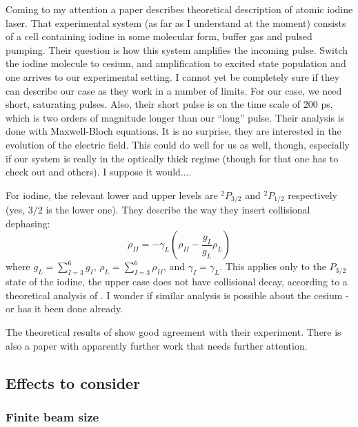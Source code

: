 \documentclass{article}
\begin{document}
\begin{spacing}{1.1}
Coming to my attention a paper \cite{Riley1979} describes theoretical description of atomic iodine laser. That experimental system (as far as I understand at the moment) consists of a cell containing iodine in some molecular form, buffer gas and pulsed pumping. Their question is how this system amplifies the incoming pulse. Switch the iodine molecule to cesium, and amplification to excited state population and one arrives to our experimental setting. I cannot yet be completely sure if they can describe our case as they work in a number of limits. For our case, we need short, saturating pulses. Also, their short pulse is on the time scale of 200 ps, which is two orders of magnitude longer than our ``long'' pulse. Their analysis is done with Maxwell-Bloch equations. It is no surprise, they are interested in the evolution of the electric field. This could do well for us as well, though, especially if our system is really in the optically thick regime (though for that one has to check out \cite{Godone2002} and others). I suppose it would....

For iodine, the relevant lower and upper levels are $^2P_{3/2}$ and $^2P_{1/2}$ respectively (yes, $3/2$ is the lower one). They describe the way they insert collisional dephasing:
\begin{equation}
\dot \rho_{II} = - \gamma_{L} \left(\rho_{II} - \frac{g_{I}}{g_{L}} \rho_{L}\right) 
\end{equation}
where $g_{L} = \sum_{I=3}^{6}g_{I}$, $\rho_{L}=\sum_{I=3}^{6} \rho_{II}$, and $\gamma_{I} = \gamma_{L}$. This applies only to the $P_{3/2}$ state of the iodine, the upper case does not have collisional decay, according to a theoretical analysis of \cite{Yukov1973}. I wonder if similar analysis is possible about the cesium - or has it been done already.

The theoretical results of \cite{Riley1979} show good agreement with their experiment. There is also a paper with apparently further work \cite{Uchiyama1982} that needs further attention.

 

\subsection{Effects to consider}

\subsubsection{Finite beam size}


\end{spacing}
\end{document}
